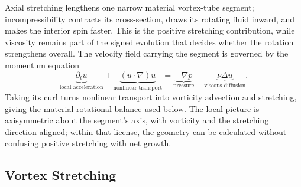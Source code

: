 
Axial stretching lengthens one narrow material vortex-tube segment; incompressibility contracts its cross-section, draws its rotating fluid inward, and makes the interior spin faster. This is the positive stretching contribution, while viscosity remains part of the signed evolution that decides whether the rotation strengthens overall. The velocity field carrying the segment is governed by the momentum equation
\[
  \underbrace{\partial_t u}_{\text{local acceleration}}
  +
  \underbrace{(u\cdot\nabla)u}_{\text{nonlinear transport}}
  =
  \underbrace{-\nabla p}_{\text{pressure}}
  +
  \underbrace{\nu\Delta u}_{\text{viscous diffusion}}.
\]
Taking its curl turns nonlinear transport into vorticity advection and stretching, giving the material rotational balance used below. The local picture is axisymmetric about the segment's axis, with vorticity and the stretching direction aligned; within that license, the geometry can be calculated without confusing positive stretching with net growth.

\subsection{Vortex Stretching}\label{sub:ThePerfectlyStretchingVortex}

